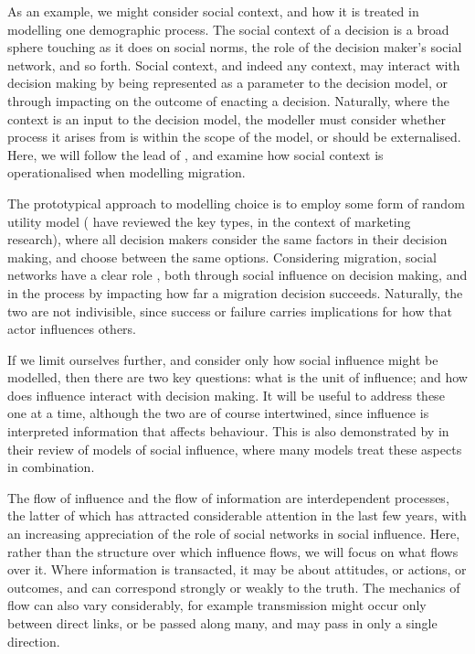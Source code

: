 \documentclass{article}
\begin{document}
As an example, we might consider social context, and how it is treated in modelling one demographic process. The social context of a decision is a broad sphere touching as it does on social norms, the role of the decision maker's social network, and so forth. Social context, and indeed any context, may interact with decision making by being represented as a parameter to the decision model, or through impacting on the outcome of enacting a decision. Naturally, where the context is an input to the decision model, the modeller must consider whether process it arises from is within the scope of the model, or should be externalised.
Here, we will follow the lead of \citet{Klabunde}, and examine how social context is operationalised when modelling migration. 

The prototypical approach to modelling choice is to employ some form of random utility model (\citet{Baltas2001} have reviewed the key types, in the context of marketing research), where all decision makers consider the same factors in their decision making, and choose between the same options. Considering migration, social networks have a clear role \citep{Epstein2006}, both through social influence on decision making, and in the process by impacting how far a migration decision succeeds. Naturally, the two are not indivisible, since success or failure carries implications for how that actor influences others.

If we limit ourselves further, and consider only how social influence might be modelled, then there are two key questions: what is the unit of influence; and how does influence interact with decision making. It will be useful to address these one at a time, although the two are of course intertwined, since influence is interpreted information that affects behaviour. This is also demonstrated by \citet{Mason2007} in their review of models of social influence, where many models treat these aspects in combination.

The flow of influence and the flow of information are interdependent processes, the latter of which has attracted considerable attention in the last few years, with an increasing appreciation of the role of social networks in social influence. Here, rather than the structure over which influence flows, we will focus on what flows over it. 
Where information is transacted, it may be about attitudes, or actions, or outcomes, and can correspond strongly or weakly to the truth. The mechanics of flow can also vary considerably, for example transmission might occur only between direct links, or be passed along many, and may pass in only a single direction.
\end{document}
